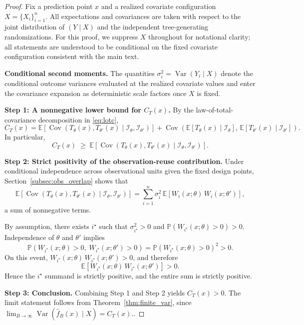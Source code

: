 \documentclass[11pt]{article}
\theoremstyle{plain}
\theoremstyle{definition}
\theoremstyle{remark}
\DeclareMathOperator{\Var}{Var}
\DeclareMathOperator{\Cov}{Cov}
\begin{document}
\begin{proof}
	Fix a prediction point \(x\) and a realized covariate configuration \(X=\{X_i\}_{i=1}^n\). All expectations and covariances are taken with respect to the joint distribution of $(Y\mid X)$ and the independent tree-generating randomizations. For this proof, we suppress $X$ throughout for notational clarity; all statements are understood to be conditional on the fixed covariate configuration consistent with the main text. 
	
	\medskip
	
	\textbf{Conditional second moments.}
	The quantities \(\sigma_i^2=\Var(Y_i\mid X)\) denote the conditional outcome variances evaluated at the realized covariate values and enter the covariance expansion as deterministic scale factors once $X$ is fixed.
	
	\medskip
	
	\textbf{Step 1: A nonnegative lower bound for \(C_T(x)\).}
	By the law-of-total-covariance decomposition in \eqref{eq:lotc},
	\[
	C_T(x)
	=
	\mathbb E\!\left[
	\Cov\!\left(
	T_\theta(x),T_{\theta'}(x)\mid \mathcal I_\theta,\mathcal I_{\theta'}
	\right)
	\right]
	+
	\Cov\!\left(
	\mathbb E[T_\theta(x)\mid \mathcal I_\theta],\,
	\mathbb E[T_{\theta'}(x)\mid \mathcal I_{\theta'}]
	\right).
	\]
	In particular,
	\[
	C_T(x)
	\;\ge\;
	\mathbb E\!\left[
	\Cov\!\left(
	T_\theta(x),T_{\theta'}(x)\mid \mathcal I_\theta,\mathcal I_{\theta'}
	\right)
	\right].
	\]
	
	\medskip
	
	\textbf{Step 2: Strict positivity of the observation-reuse contribution.}
	Under conditional independence across observational units given the fixed design points, Section~\ref{subsec:obs_overlap} shows that
	\[
	\mathbb E\!\left[
	\Cov\!\left(
	T_\theta(x),T_{\theta'}(x)\mid \mathcal I_\theta,\mathcal I_{\theta'}
	\right)
	\right]
	=
	\sum_{i=1}^n \sigma_i^2\,
	\mathbb E\!\left[
	W_i(x;\theta)\,W_i(x;\theta')
	\right],
	\]
	a sum of nonnegative terms.
	
	By assumption, there exists \(i^\star\) such that \(\sigma_{i^\star}^2>0\) and \(\mathbb P(W_{i^\star}(x;\theta)>0)>0\). Independence of \(\theta\) and \(\theta'\) implies
	\[
	\mathbb P\!\left(
	W_{i^\star}(x;\theta)>0,\;
	W_{i^\star}(x;\theta')>0
	\right)
	=
	\mathbb P\!\left(
	W_{i^\star}(x;\theta)>0
	\right)^2
	>
	0.
	\]
	On this event, \(W_{i^\star}(x;\theta)\,W_{i^\star}(x;\theta')>0\), and therefore
	\[
	\mathbb E\!\left[
	W_{i^\star}(x;\theta)\,W_{i^\star}(x;\theta')
	\right]
	>
	0.
	\]
	Hence the \(i^\star\) summand is strictly positive, and the entire sum is strictly positive.
	
	\medskip
	
	\textbf{Step 3: Conclusion.}
	Combining Step 1 and Step 2 yields \(C_T(x)>0\). The limit statement follows from Theorem~\ref{thm:finite_var}, since \(\lim_{B\to\infty}\Var(\hat f_B(x)\mid X)=C_T(x).\).
\end{proof}
\end{document}
